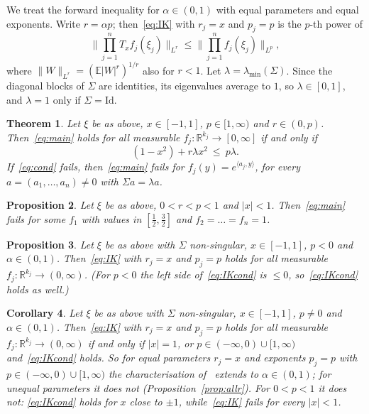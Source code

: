 \documentclass[11pt]{amsart}
\newtheorem{theorem}{Theorem}[section]
\newtheorem{proposition}[theorem]{Proposition}
\newtheorem{corollary}[theorem]{Corollary}
\theoremstyle{definition}
\newcommand{\E}{\mathbb{E}}
\newcommand{\R}{\mathbb{R}}
\newcommand{\Id}{\mathrm{Id}}
\begin{document}
We treat the forward inequality for $\alpha\in(0,1)$ with equal parameters and equal exponents. Write $r=\alpha p$;
then~\eqref{eq:IK} with $r_j=x$ and $p_j=p$ is the $p$-th power of
\begin{equation}\label{eq:main}
\Big\|\prod_{j=1}^nT_xf_j(\xi_j)\Big\|_{L^r}\le\Big\|\prod_{j=1}^nf_j(\xi_j)\Big\|_{L^p},
\end{equation}
where $\|W\|_{L^r}=(\E|W|^r)^{1/r}$ also for $r<1$. Let $\lambda=\lambda_{\min}(\Sigma)$. Since the diagonal blocks of
$\Sigma$ are identities, its eigenvalues average to $1$, so $\lambda\in[0,1]$, and $\lambda=1$ only if $\Sigma=\Id$.

\begin{theorem}\label{thm:main}
Let $\xi$ be as above, $x\in[-1,1]$, $p\in[1,\infty)$ and $r\in(0,p)$. Then~\eqref{eq:main} holds for all measurable
$f_j:\R^{k_j}\to[0,\infty]$ if and only if
\begin{equation}\label{eq:cond}
(1-x^2)+r\lambda x^2\ \le\ p\lambda .
\end{equation}
If~\eqref{eq:cond} fails, then~\eqref{eq:main} fails for $f_j(y)=e^{\langle a_j,y\rangle}$, for every
$a=(a_1,\dots,a_n)\ne0$ with $\Sigma a=\lambda a$.
\end{theorem}

\begin{proposition}\label{prop:psmall}
Let $\xi$ be as above, $0<r<p<1$ and $|x|<1$. Then~\eqref{eq:main} fails for some $f_1$ with values in
$[\frac12,\frac32]$ and $f_2=\dots=f_n=1$.
\end{proposition}

\begin{proposition}\label{prop:pneg}
Let $\xi$ be as above with $\Sigma$ non-singular, $x\in[-1,1]$, $p<0$ and $\alpha\in(0,1)$. Then~\eqref{eq:IK} with
$r_j=x$ and $p_j=p$ holds for all measurable $f_j:\R^{k_j}\to(0,\infty)$. (For $p<0$ the left side
of~\eqref{eq:IKcond} is $\le0$, so~\eqref{eq:IKcond} holds as well.)
\end{proposition}

\begin{corollary}\label{cor:IK}
Let $\xi$ be as above with $\Sigma$ non-singular, $x\in[-1,1]$, $p\ne0$ and $\alpha\in(0,1)$. Then~\eqref{eq:IK}
with $r_j=x$ and $p_j=p$ holds for all measurable $f_j:\R^{k_j}\to(0,\infty)$ if and only if $|x|=1$, or
$p\in(-\infty,0)\cup[1,\infty)$ and~\eqref{eq:IKcond} holds. So for equal parameters $r_j=x$ and exponents $p_j=p$
with $p\in(-\infty,0)\cup[1,\infty)$ the characterisation of~\cite[Thm.~9(i)]{IK25} extends to $\alpha\in(0,1)$; for
unequal parameters it does not (Proposition~\ref{prop:allr}). For $0<p<1$ it does not:
\eqref{eq:IKcond} holds for $x$ close to $\pm1$, while~\eqref{eq:IK} fails for every $|x|<1$.
\end{corollary}
\end{document}
